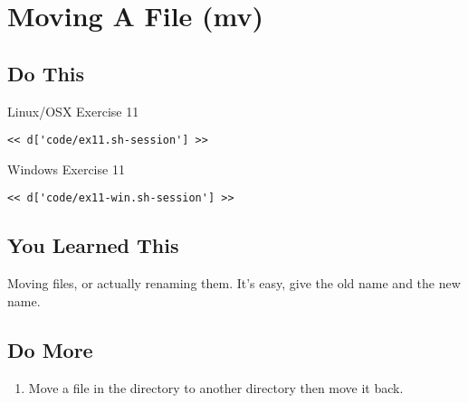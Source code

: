 \chapter{Moving A File (mv)}

\section{Do This}

\begin{code}{Linux/OSX Exercise 11}
\begin{Verbatim}
<< d['code/ex11.sh-session'] >>
\end{Verbatim}
\end{code}

\begin{code}{Windows Exercise 11}
\begin{Verbatim}
<< d['code/ex11-win.sh-session'] >>
\end{Verbatim}
\end{code}

\section{You Learned This}

Moving files, or actually renaming them.  It's easy, give the old name and
the new name.

\section{Do More}

\begin{enumerate}
\item Move a file in the  directory to another directory
    then move it back.
\end{enumerate}


